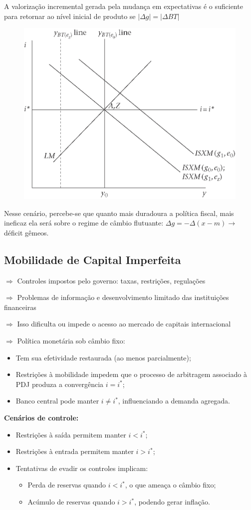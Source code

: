 \documentclass[a4paper,12pt]{article}[abntex2]
\begin{document}
A valorização incremental gerada pela mudança em expectativas é o suficiente para retornar ao nível inicial de produto se \(|\Delta g|=|\Delta BT|\)

\begin{figure}[H]
    \centering
    \includegraphics[width=0.7\linewidth]{Imagens/a24i1.png}
\end{figure}

Nesse cenário, percebe-se que quanto mais duradoura a política fiscal, mais ineficaz ela será sobre o regime de câmbio flutuante: \(\Delta g=-\Delta(x-m) \rightarrow\) déficit gêmeos. 

\subsection{\textbf{Mobilidade de Capital Imperfeita}}

$\Rightarrow$ Controles impostos pelo governo: taxas, restrições, regulações

$\Rightarrow$ Problemas de informação e desenvolvimento limitado das instituições financeiras

$\Rightarrow$ Isso dificulta ou impede o acesso ao mercado de capitais internacional

$\Rightarrow$ Política monetária sob câmbio fixo:
\begin{itemize}
  \item Tem sua efetividade restaurada (ao menos parcialmente);
  \item Restrições à mobilidade impedem que o processo de arbitragem associado à PDJ produza a convergência $i = i^*$;
  \item Banco central pode manter $i \ne i^*$, influenciando a demanda agregada.
\end{itemize}

\textbf{Cenários de controle:}
\begin{itemize}
  \item Restrições à saída permitem manter $i < i^*$;
  \item Restrições à entrada permitem manter $i > i^*$;
  \item Tentativas de evadir os controles implicam:
  \begin{itemize}
    \item Perda de reservas quando $i < i^*$, o que ameaça o câmbio fixo;
    \item Acúmulo de reservas quando $i > i^*$, podendo gerar inflação.
  \end{itemize}
\end{itemize}
\end{document}
